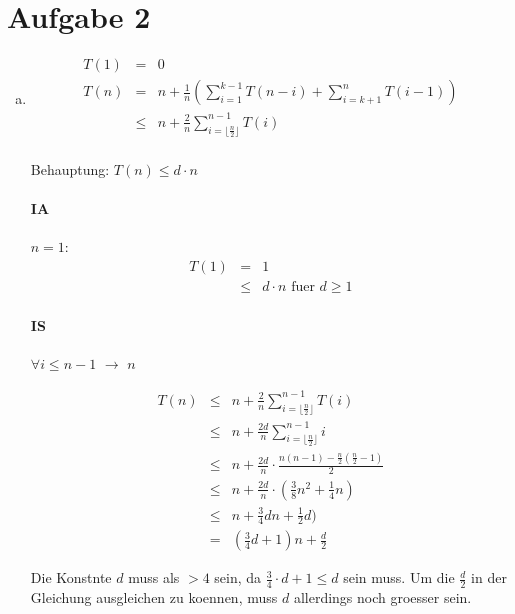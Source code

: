 \section*{Aufgabe 2}
\begin{enumerate}[(a)]
\item 
    \begin{eqnarray}
    T(1) &=& 0 \\
    T(n) &=& n + \frac{1}{n} \left( \sum_{i=1}^{k-1} T(n-i) + \sum_{i=k+1}^{n} T(i-1) \right) \\
         &\leq& n + \frac{2}{n} \sum_{i=\lfloor \frac{n}{2} \rfloor}^{n-1} T(i) \\
    \end{eqnarray}

    Behauptung: $T(n) \leq d \cdot n$

    \paragraph{IA} $n=1$: 
    \begin{eqnarray}
        T(1) &=& 1 \\ &\leq& d \cdot n \text{ fuer $d\geq 1$}
    \end{eqnarray}

    \paragraph{IS} $\forall i\leq n-1$ $\to$ $n$

    \begin{eqnarray}
    T(n) 
         &\leq& n + \frac{2}{n} \sum_{i=\lfloor \frac{n}{2} \rfloor}^{n-1} T(i) \\
         &\leq& n + \frac{2d}{n} \sum_{i=\lfloor \frac{n}{2} \rfloor}^{n-1} i \\
         &\leq& n + \frac{2d}{n} \cdot \frac{n(n-1) - \frac{n}{2}(\frac{n}{2}-1)}{2}  \\
         &\leq& n + \frac{2d}{n} \cdot (\frac{3}{8}n^2 + \frac{1}{4} n) \\
         &\leq& n + \frac{3}{4} d n + \frac{1}{2} d) \\
         &=& \left( \frac{3}{4} d + 1 \right) n + \frac{d}{2}
    \end{eqnarray}

    Die Konstnte $d$ muss als $>4$ sein, da $\frac{3}{4}\cdot d + 1 \leq d$ sein muss.
    Um die $\frac{d}{2}$ in der Gleichung ausgleichen zu koennen, muss $d$ allerdings noch groesser sein.


\end{enumerate}
